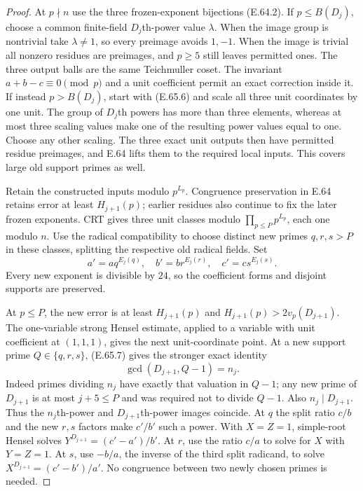 \begin{proof}
At $p\nmid n$ use the three
frozen-exponent bijections
(E.64.2). If $p\leq B(D_j)$,
choose a common finite-field
$D_j$th-power value $\lambda$.
When the image group is nontrivial
take $\lambda\ne1$, so every
preimage avoids $1,-1$. When
the image is trivial all nonzero
residues are preimages, and
$p\geq5$ still leaves permitted
ones. The three output balls
are the same Teichmuller coset.
The invariant $a+b-c\equiv0\pmod p$
and a unit coefficient permit
an exact correction inside it.
If instead $p>B(D_j)$, start
with (E.65.6) and scale all three
unit coordinates by one unit.
The group of $D_j$th powers has
more than three elements, whereas
at most three scaling values
make one of the resulting power
values equal to one.
Choose any other scaling.
The three exact unit outputs
then have permitted residue
preimages, and E.64 lifts them
to the required local inputs.
This covers large old support
primes as well.

Retain the constructed inputs
modulo $p^{L_p}$.
Congruence preservation in E.64
retains error at least
$H_{j+1}(p)$; earlier residues
also continue to fix the
later frozen exponents.
CRT gives three unit classes
modulo $\prod_{p\leq P}p^{L_p}$,
each one modulo $n$.
Use the radical compatibility
to choose distinct new primes
$q,r,s>P$ in these classes,
splitting the respective old
radical fields. Set
\[
 a'=a q^{E_j(q)},\quad
 b'=b r^{E_j(r)},\quad
 c'=c s^{E_j(s)}.
 \tag{E.65.9}
\]
Every new exponent is divisible
by $24$, so the coefficient
forms and disjoint supports
are preserved.

At $p\leq P$, the new error is
at least $H_{j+1}(p)$ and
$H_{j+1}(p)>2v_p(D_{j+1})$.
The one-variable strong Hensel
estimate, applied to a variable
with unit coefficient at
$(1,1,1)$, gives the next
unit-coordinate point.
At a new support prime
$Q\in\{q,r,s\}$, (E.65.7) gives
the stronger exact identity
\[
                   \gcd(D_{j+1},Q-1)=n_j.
 \tag{E.65.10}
\]
Indeed primes dividing $n_j$
have exactly that valuation in
$Q-1$; any new prime of
$D_{j+1}$ is at most $j+5\leq P$
and was required not to divide
$Q-1$. Also $n_j\mid D_{j+1}$.
Thus the $n_j$th-power and
$D_{j+1}$th-power images coincide.
At $q$ the split ratio $c/b$
and the new $r,s$ factors make
$c'/b'$ such a power.
With $X=Z=1$, simple-root
Hensel solves
$Y^{D_{j+1}}=(c'-a')/b'$.
At $r$, use the ratio $c/a$
to solve for $X$ with $Y=Z=1$.
At $s$, use $-b/a$, the inverse
of the third split radicand,
to solve
$X^{D_{j+1}}=(c'-b')/a'$.
No congruence between two newly
chosen primes is needed.


\end{proof}
